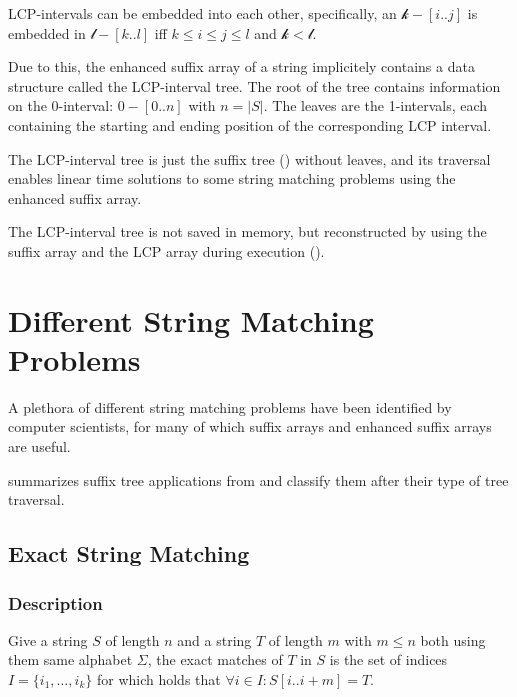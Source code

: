 \documentclass[a4paper,10pt]{article}
\begin{document}

LCP-intervals can be embedded into each other, specifically, an
$\mathcal{k}-[i..j]$ is embedded in $\mathcal{l}-[k..l]$ iff $k \le i
\le j \le l$ and $\mathcal{k}<\mathcal{l}$.

Due to this, the enhanced suffix array of a string implicitely contains
a data structure called the LCP-interval tree. The root of the tree
contains information on the 0-interval: $0-[0..n]$ with $n=|S|$. The
leaves are the 1-intervals, each containing the starting and ending
position of the corresponding LCP interval.

The LCP-interval tree is just the suffix tree (\citealt{weiner1973linear})
without leaves, and its traversal enables linear time solutions to some
string matching problems using the enhanced suffix array.

The LCP-interval tree is not saved in memory, but reconstructed
by using the suffix array and the LCP array during execution
(\citealt{abouelhoda2002enhanced}).


\section*{Different String Matching Problems}

A plethora of different string matching problems have been identified
by computer scientists, for many of which suffix arrays and enhanced
suffix arrays are useful.

\citealt[pg. 2]{abouelhoda2004replacing} summarizes suffix tree applications
from \citealt[chap. 2]{gusfield1997algorithms} and classify them after their
type of tree traversal.

\subsection*{Exact String Matching}

\subsubsection*{Description}

Give a string $S$ of length $n$ and a string $T$ of length $m$ with $m
\le n$ both using them same alphabet $\Sigma$, the exact matches of $T$
in $S$ is the set of indices $I=\{i_1, \ldots, i_k\}$ for which holds
that $\forall i \in I: S[i..i+m]=T$.
\end{document}
